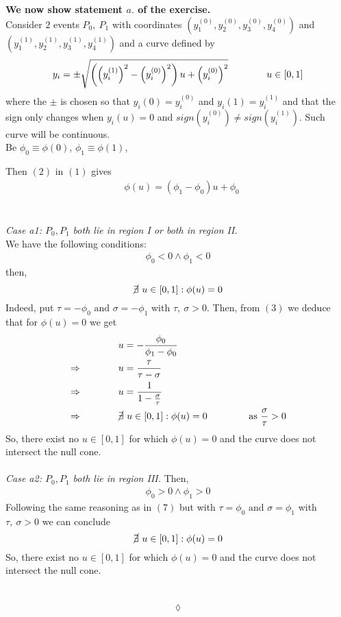 \textbf{We now show statement $\mathit{a.}$ of the exercise.}\\
Consider $2$ events $P_0,\ P_1$ with coordinates $(y_1^{(0)},y_2^{(0)},y_3^{(0)},y_4^{(0)})$ and $(y_1^{(1)},y_2^{(1)},y_3^{(1)},y_4^{(1)})$  and a curve defined by 
\begin{align}
y_i= \pm\sqrt{\left(\left(y_i^{(1)}\right)^2-\left(y_i^{(0)}\right)^2\right)u + \left(y_i^{(0)}\right)^2}\quad\quad\quad\quad u\in \left[0,1\right]
\end{align}
where the $\pm$ is chosen so that $y_i(0) = y_i^{(0)}$ and $y_i(1) = y_i^{(1)}$ and that the sign only changes when $y_i(u)=0$ and $sign\left(y_i^{(0)}\right) \neq sign\left(y_i^{(1)}\right)$. Such curve will be continuous.\\
Be $\phi_0\equiv \phi(0)$, $\phi_1\equiv \phi(1)$,

Then $(2)$ in $(1)$ gives
\begin{align}
&\phi(u) = \left(\phi_1-\phi_0\right)u+\phi_0
\end{align}\\\\
\textit{Case a1: $P_0, P_1$ both lie in region I or both in region II.} \\
We have the following conditions:
\begin{align*}
\phi_0 < 0\wedge \phi_1  < 0
\end{align*}
then, $$\cancel{\exists } \  u \in \left[0,1\right]: \phi(u)=0$$
 Indeed, put $\tau = -\phi_0 \text{ and }  \sigma =-\phi_1  $ with $\tau,\ \sigma>0$. Then, from $(3)$ we deduce that for  $\phi(u)=0$ we get 
 \begin{align}
 &u= -\frac{\phi_0}{\phi_1-\phi_0}\\
 \Rightarrow\quad\quad\quad\quad & u= \frac{\tau}{\tau-\sigma}\\
 \Rightarrow\quad\quad\quad\quad & u= \frac{1}{1-\frac{\sigma}{\tau}}\\
 \Rightarrow\quad\quad\quad\quad &\cancel{\exists}  \  u \in \left[0,1\right]: \phi(u)=0 \quad\quad\quad\quad \text{ as } \frac{\sigma}{\tau} >0
 \end{align}
So, there exist no $u\in\left[0,1\right]$ for which $\phi(u)=0$ and the curve does not intersect the null cone.\\\\
\textit{Case a2: $P_0, P_1$ both lie in region III.} Then,
\begin{align*}
\phi_0 > 0\wedge \phi_1  > 0
\end{align*}
Following the same reasoning as in $(7)$ but with $\tau = \phi_0 \text{ and }  \sigma =\phi_1  $ with $\tau,\ \sigma >0$ we can conclude
$$\cancel{\exists } \  u \in \left[0,1\right]: \phi(u)=0$$ 
So, there exist no $u\in\left[0,1\right]$ for which $\phi(u)=0$ and the curve does not intersect the null cone.\\\\
\\$$\lozenge$$

